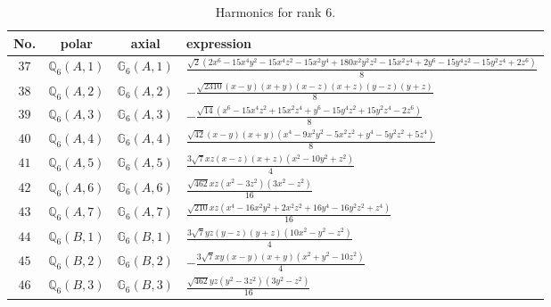 \documentclass[fleqn,8pt,landscape]{jsarticle}
\begin{document}
\begin{table}[ht!]
\begin{center}
\caption{Harmonics for rank 6.}
\renewcommand{\arraystretch}{1.3}
\begin{tabular}{cccl} \hline \hline
No. & polar & axial & expression \\ \hline
$ 37 $ & $ \mathbb{Q}_{6}(A,1) $ & $ \mathbb{G}_{6}(A,1) $ & $ \frac{\sqrt{2} \left(2 x^{6} - 15 x^{4} y^{2} - 15 x^{4} z^{2} - 15 x^{2} y^{4} + 180 x^{2} y^{2} z^{2} - 15 x^{2} z^{4} + 2 y^{6} - 15 y^{4} z^{2} - 15 y^{2} z^{4} + 2 z^{6}\right)}{8} $ \\
$ 38 $ & $ \mathbb{Q}_{6}(A,2) $ & $ \mathbb{G}_{6}(A,2) $ & $ - \frac{\sqrt{2310} \left(x - y\right) \left(x + y\right) \left(x - z\right) \left(x + z\right) \left(y - z\right) \left(y + z\right)}{8} $ \\
$ 39 $ & $ \mathbb{Q}_{6}(A,3) $ & $ \mathbb{G}_{6}(A,3) $ & $ - \frac{\sqrt{14} \left(x^{6} - 15 x^{4} z^{2} + 15 x^{2} z^{4} + y^{6} - 15 y^{4} z^{2} + 15 y^{2} z^{4} - 2 z^{6}\right)}{8} $ \\
$ 40 $ & $ \mathbb{Q}_{6}(A,4) $ & $ \mathbb{G}_{6}(A,4) $ & $ \frac{\sqrt{42} \left(x - y\right) \left(x + y\right) \left(x^{4} - 9 x^{2} y^{2} - 5 x^{2} z^{2} + y^{4} - 5 y^{2} z^{2} + 5 z^{4}\right)}{8} $ \\
$ 41 $ & $ \mathbb{Q}_{6}(A,5) $ & $ \mathbb{G}_{6}(A,5) $ & $ \frac{3 \sqrt{7} x z \left(x - z\right) \left(x + z\right) \left(x^{2} - 10 y^{2} + z^{2}\right)}{4} $ \\
$ 42 $ & $ \mathbb{Q}_{6}(A,6) $ & $ \mathbb{G}_{6}(A,6) $ & $ \frac{\sqrt{462} x z \left(x^{2} - 3 z^{2}\right) \left(3 x^{2} - z^{2}\right)}{16} $ \\
$ 43 $ & $ \mathbb{Q}_{6}(A,7) $ & $ \mathbb{G}_{6}(A,7) $ & $ \frac{\sqrt{210} x z \left(x^{4} - 16 x^{2} y^{2} + 2 x^{2} z^{2} + 16 y^{4} - 16 y^{2} z^{2} + z^{4}\right)}{16} $ \\
$ 44 $ & $ \mathbb{Q}_{6}(B,1) $ & $ \mathbb{G}_{6}(B,1) $ & $ \frac{3 \sqrt{7} y z \left(y - z\right) \left(y + z\right) \left(10 x^{2} - y^{2} - z^{2}\right)}{4} $ \\
$ 45 $ & $ \mathbb{Q}_{6}(B,2) $ & $ \mathbb{G}_{6}(B,2) $ & $ - \frac{3 \sqrt{7} x y \left(x - y\right) \left(x + y\right) \left(x^{2} + y^{2} - 10 z^{2}\right)}{4} $ \\
$ 46 $ & $ \mathbb{Q}_{6}(B,3) $ & $ \mathbb{G}_{6}(B,3) $ & $ \frac{\sqrt{462} y z \left(y^{2} - 3 z^{2}\right) \left(3 y^{2} - z^{2}\right)}{16} $ \\

\end{tabular}
\end{center}
\end{table}
\end{document}
